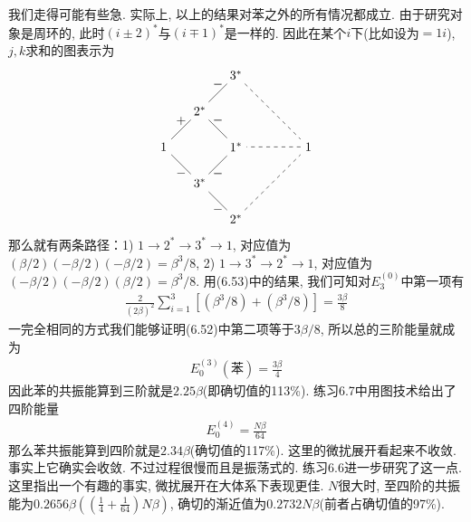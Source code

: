 我们走得可能有些急. 实际上, 以上的结果对苯之外的所有情况都成立. 由于研究对象是周环的, 此时$(i\pm 2)^*$与$(i\mp1)^*$是一样的. 因此在某个$i$下(比如设为$=1i$), $j,k$求和的图表示为
\begin{align*}
\begin{tikzpicture}[baseline={(0,0)}]
\node(i)at(0,0){$1$};\node(ip1)at(1,1){$2^*$};\node(ip2)at(2,2){$3^*$};\node(is)at(2,0){$1^*$};\node(im1)at(1,-1){$3^*$};\node(im2)at(2,-2){$2^*$};\node(ie)at(4,0){$1$};
\draw (i)--node[above]{+}(ip1)--node[above]{$-$}(is)--node[below]{$-$}(im1)--node[below]{$-$}(i);
\draw (ip1)--node[above]{$-$}(ip2);
\draw (im1)--node[below]{$-$}(im2);
\draw[dashed] (ip2)--(ie)--(is);
\draw[dashed] (im2)--(ie);
\end{tikzpicture}
\end{align*}
那么就有两条路径：1) $1\to2^*\to3^*\to1$, 对应值为$(\beta/2)(-\beta/2)(-\beta/2)=\beta^3/8$, 2) $1\to3^*\to2^*\to1$, 对应值为$(-\beta/2)(-\beta/2)(\beta/2)=\beta^3/8$. 用(6.53)中的结果, 我们可知对$E_3^{(0)}$中第一项有
\begin{align*}
\frac{2}{(2\beta)^2} \sum_{i=1}^{3}[(\beta^3/8)+(\beta^3/8)] = \frac{3\beta}{8}
\end{align*}
一完全相同的方式我们能够证明(6.52)中第二项等于$3\beta/8$, 所以总的三阶能量就成为
\begin{align}
E_0^{(3)}(\text{苯}) = \frac{3\beta}{4}
\end{align}
因此苯的共振能算到三阶就是$2.25\beta$(即确切值的113\%). 练习6.7中用图技术给出了四阶能量
\begin{align}
E_0^{(4)} = \frac{N\beta}{64}
\end{align}
那么苯共振能算到四阶就是$2.34\beta$(确切值的117\%). 这里的微扰展开看起来不收敛. 事实上它确实会收敛. 不过过程很慢而且是振荡式的. 练习6.6进一步研究了这一点. 这里指出一个有趣的事实, 微扰展开在大体系下表现更佳. $N$很大时, 至四阶的共振能为$0.2656\beta((\frac{1}{4}+\frac{1}{64})N\beta)$, 确切的渐近值为$0.2732N\beta$(前者占确切值的97\%).
